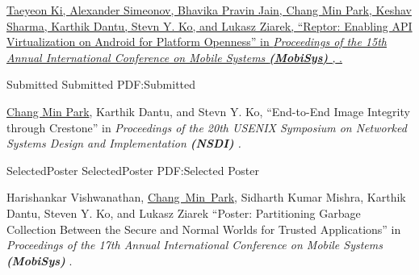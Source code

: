\documentclass[letterpaper,MMMyyyy,nonstopmode]{simpleresumecv}
\begin{document}
\begin{Body}
\Gap
\vspace{0.5ex}
\NumberedItem{[4]}
\href{https://dl.acm.org/citation.cfm?id=3081341}
{Taeyeon Ki, Alexander Simeonov, Bhavika Pravin Jain, \underline{Chang Min Park},
Keshav Sharma, Karthik Dantu, Stevn Y. Ko, and Lukasz Ziarek, 
``Reptor: Enabling API Virtualization on Android for Platform Openness'' in 
\textit{Proceedings of the 15th Annual International Conference on Mobile Systems \textbf{(MobiSys)}
, }.}


\vspace{1ex}

\SubSection
{Submitted}
{Submitted}
{PDF:Submitted}

\begingroup
\renewcommand{\MaxNumberedItem}{[88]}

\Gap
\NumberedItem{[1]}
\underline{Chang Min Park}, Karthik Dantu, and Stevn Y. Ko,
``End-to-End Image Integrity through Crestone'' in
\textit{Proceedings of the 20th USENIX Symposium on Networked Systems Design and Implementation \textbf{(NSDI)}
.}




\vspace{0ex}
\Section
{Selected\newline Poster}
{Selected\newline Poster}
{PDF:Selected Poster}



\begingroup
\renewcommand{\MaxNumberedItem}{[88]}

\BigGap
\BulletItem
Harishankar Vishwanathan, \underline{Chang~Min~Park}, Sidharth Kumar Mishra, Karthik Dantu, 
Steven Y. Ko, and Lukasz Ziarek
``Poster: Partitioning Garbage Collection Between the Secure and Normal Worlds for Trusted Applications'' in
\textit{Proceedings of the 17th Annual International Conference on Mobile Systems \textbf{(MobiSys)}
}.





\end{Body}
\end{document}
